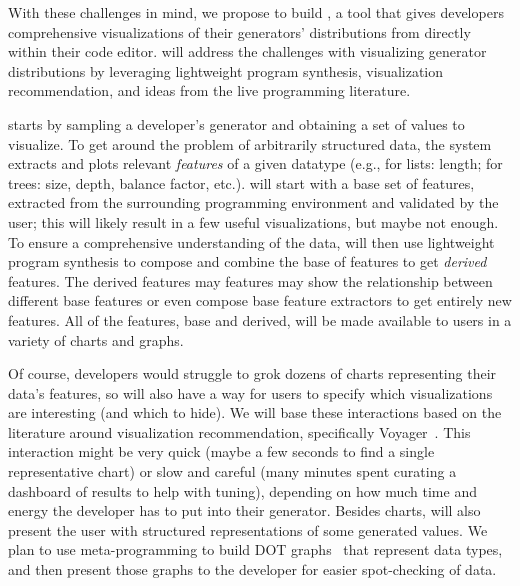 With these challenges in mind, we propose to build \genvis, a tool that
gives developers comprehensive visualizations of their generators' distributions
from directly within their code editor. \genvis{} will address the challenges
with visualizing generator distributions by leveraging lightweight program
synthesis, visualization recommendation, and ideas from the live programming
literature.

\genvis{} starts by sampling a developer's generator and obtaining a set of
values to visualize. To get around the problem of arbitrarily structured data,
the system extracts and plots relevant {\em features} of a given datatype (e.g.,
for lists: length; for trees: size, depth, balance factor, etc.). \genvis{} will
start with a base set of features, extracted from the surrounding programming
environment and validated by the user; this will likely result in a few useful
visualizations, but maybe not enough. To ensure a comprehensive understanding of
the data, \genvis{} will then use lightweight program synthesis to compose and
combine the base of features to get {\em derived} features. The derived features
may features may show the relationship between different base features or even
compose base feature extractors to get entirely new features.  All of the
features, base and derived, will be made available to users in a variety of
charts and graphs.

Of course, developers would struggle to grok dozens of charts representing
their data's features, so \genvis{} will also have a way for users to specify
which visualizations are interesting (and which to hide). We will base these
interactions based on the literature around visualization recommendation,
specifically Voyager~\cite{wongsuphasawat_voyager_2016,
wongsuphasawat_voyager_2017}. This interaction might be very quick (maybe a few
seconds to find a single representative chart) or slow and careful (many minutes
spent curating a dashboard of results to help with tuning), depending on how
much time and energy the developer has to put into their generator. Besides
charts, \genvis{} will also present the user with structured representations of
some generated values. We plan to use meta-programming to build
DOT graphs~\cite{ellson_graphviz_2002} that represent data types, and then
present those graphs to the developer for easier spot-checking of data.

